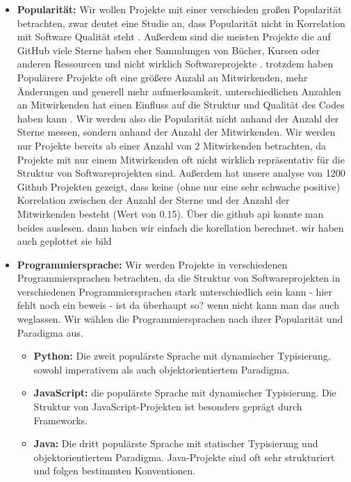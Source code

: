 \begin{itemize}
    \item \textbf{Popularität:} Wir wollen Projekte mit einer verschieden großen Popularität betrachten, zwar deutet eine Studie an, dass Popularität nicht in Korrelation mit Software Qualität steht \cite{popAndQuality}. Außerdem sind die meisten Projekte die auf GitHub viele Sterne haben eher Sammlungen von Bücher, Kursen oder anderen Ressourcen und nicht wirklich Softwareprojekte \cite{evanli/github-ranking_2025}.
    trotzdem haben Populärere Projekte oft eine größere Anzahl an Mitwirkenden, mehr Änderungen und generell mehr aufmerksamkeit. 
    unterschiedlichen Anzahlen an Mitwirkenden hat einen Einfluss auf die Struktur und Qualität des Codes haben kann \cite{numDevs}. Wir werden also die Popularität nicht anhand der Anzahl der Sterne messen, sondern anhand der Anzahl der Mitwirkenden. Wir werden nur Projekte bereits ab einer Anzahl von 2 Mitwirkenden betrachten, da Projekte mit nur einem Mitwirkenden oft nicht wirklich repräsentativ für die Struktur von Softwareprojekten sind. Außerdem hat unsere analyse von 1200 Github Projekten gezeigt, dass keine (ohne nur eine sehr schwache positive) Korrelation zwischen der Anzahl der Sterne und der Anzahl der Mitwirkenden besteht (Wert von 0.15). Über die github api konnte man beides auslesen. dann haben wir einfach die korellation berechnet. wir haben auch geplottet sie bild
    \item \textbf{Programmiersprache:} Wir werden Projekte in verschiedenen Programmiersprachen betrachten, da die Struktur von Softwareprojekten in verschiedenen Programmiersprachen stark unterschiedlich sein kann - hier fehlt noch ein beweis - ist da überhaupt so? wenn nicht kann man das auch weglassen. Wir wählen die Programmiersprachen nach ihrer Popularität und Paradigma aus. 
    \begin{itemize}
        \item \textbf{Python:} Die zweit populärste Sprache \cite{software_state_2022} mit dynamischer Typisierung, sowohl imperativem als auch objektorientiertem Paradigma. 
        \item \textbf{JavaScript:} die populärste Sprache \cite{software_state_2022} mit dynamischer Typisierung. Die Struktur von JavaScript-Projekten ist besonders geprägt durch Frameworks.
        \item \textbf{Java:} Die dritt populärste Sprache \cite{software_state_2022} mit statischer Typisierung und objektorientiertem Paradigma. Java-Projekte sind oft sehr strukturiert und folgen bestimmten Konventionen.

\end{itemize}
\end{itemize}
